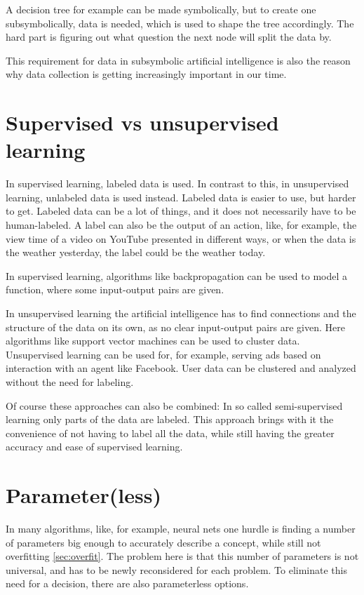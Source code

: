 A decision tree for example can be made symbolically, but to create one subsymbolically, data is needed, which is used to shape the tree accordingly.
The hard part is figuring out what question the next node will split the data by. 

This requirement for data in subsymbolic artificial intelligence is also the reason why data collection is getting increasingly important in our time. 

\section{Supervised vs unsupervised learning} \cite[p695]{MA}
In supervised learning, labeled data is used. In contrast to this, in unsupervised learning,  unlabeled data is used instead. 
Labeled data is easier to use, but harder to get. Labeled data can be a lot of things, and it does not necessarily have to be human-labeled. A label can also be the output of an action, like, for example, the view time of a video on YouTube presented in different ways, or when the data is the weather yesterday, the label could be the weather today.

In supervised learning, algorithms like backpropagation can be used to model a function, where some input-output pairs are given.

In unsupervised learning the artificial intelligence has to find connections and the structure of the data on its own, as no clear input-output pairs are given.
Here algorithms like support vector machines can be used to cluster data. Unsupervised learning can be used for, for example, serving ads based on interaction with an agent like Facebook. User data can be clustered and analyzed without the need for labeling.

Of course these approaches can also be combined: In so called semi-supervised learning only parts of the data are labeled. This approach brings with it the convenience of not having to label all the data, while still having the greater accuracy and ease of supervised learning. \cite{semisupervised}

\section{Parameter(less)} \cite[p737]{MA}
In many algorithms, like, for example, neural nets one hurdle is finding a number of parameters big enough to accurately describe a concept, while still not  overfitting \autoref{sec:overfit}. The problem here is that this number of parameters is not universal, and has to be newly reconsidered for each problem. To eliminate this need for a decision, there are also parameterless options. 

